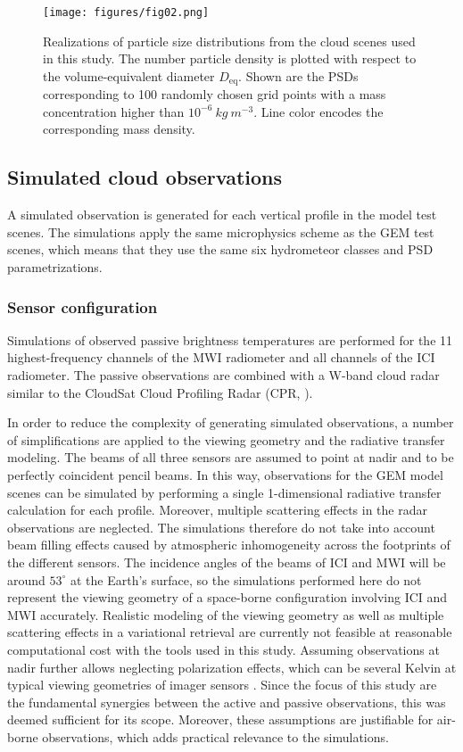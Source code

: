 \documentclass[journal abbreviation, manuscript]{copernicus}
\begin{document}
\begin{figure}[h!]
\centering \texttt{[image: figures/fig02.png]}
\caption{Realizations of particle size distributions from the cloud scenes used
  in this study. The number particle density is plotted with respect to the
  volume-equivalent diameter $D_\text{eq}$. Shown are the PSDs corresponding to
  100 randomly chosen grid points with a mass concentration higher than
  $10^{-6}\ \unit{kg\ m^{-3}}$. Line color encodes the corresponding mass density.}
\label{fig:gem_psds}
\end{figure}


\subsection{Simulated cloud observations}

A simulated observation is generated for each vertical profile in the
model test scenes. The simulations apply the same microphysics scheme
as the GEM test scenes, which means that they use the same six hydrometeor classes
and PSD parametrizations.

\subsubsection{Sensor configuration}
\label{sec:sensors}

Simulations of observed passive brightness temperatures are performed for the 11
highest-frequency channels of the MWI radiometer and all channels of the ICI
radiometer. The passive observations are combined with a W-band cloud radar
similar to the CloudSat Cloud Profiling Radar (CPR, \citet{stephens02,tanelli08}).

In order to reduce the complexity of generating simulated observations, a number
of simplifications are applied to the viewing geometry and the radiative
transfer modeling. The beams of all three sensors are assumed to point at nadir
and to be perfectly coincident pencil beams. In this way, observations for the
GEM model scenes can be simulated by performing a single 1-dimensional radiative
transfer calculation for each profile. Moreover, multiple scattering effects in
the radar observations are neglected. The simulations therefore do not take into
account beam filling effects caused by atmospheric inhomogeneity across the
footprints of the different sensors. The incidence angles of the beams of ICI
and MWI will be around $53^\circ$ at the Earth's surface, so the simulations
performed here do not represent the viewing geometry of a space-borne
configuration involving ICI and MWI accurately. Realistic modeling of the
viewing geometry as well as multiple scattering effects in a variational
retrieval are currently not feasible at reasonable computational cost with the
tools used in this study. Assuming observations at nadir further allows neglecting
polarization effects, which can be several Kelvin at typical viewing geometries
of imager sensors \cite{xie15}. Since the focus of this study are the fundamental
synergies between the active and passive observations, this was deemed
sufficient for its scope. Moreover, these assumptions are justifiable for
air-borne observations, which adds practical relevance to the simulations.
\end{document}
